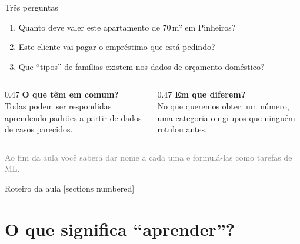 \documentclass[aspectratio=169,11pt]{beamer}
\begin{document}
\maketitle

\begin{frame}{Três perguntas}
  \begin{enumerate}
    \item Quanto deve valer este apartamento de 70\,m² em Pinheiros?
    \item Este cliente vai pagar o empréstimo que está pedindo?
    \item Que ``tipos'' de famílias existem nos dados de orçamento doméstico?
  \end{enumerate}
  \bigskip
  \begin{columns}[T]
    \begin{column}{0.47\textwidth}
      \textbf{O que têm em comum?}\\
      Todas podem ser respondidas \alert{aprendendo padrões a partir de dados}
      de casos parecidos.
    \end{column}
    \begin{column}{0.47\textwidth}
      \textbf{Em que diferem?}\\
      No que queremos obter: um \alert{número}, uma \alert{categoria} ou
      \alert{grupos} que ninguém rotulou antes.
    \end{column}
  \end{columns}
  \bigskip
  \centering\small\textcolor{gray}{Ao fim da aula você saberá dar nome a cada uma e formulá-las como tarefas de ML.}
\end{frame}

\begin{frame}{Roteiro da aula}
  [sections numbered]
  \small\tableofcontents[hideallsubsections]
\end{frame}

\section{O que significa ``aprender''?}
\end{document}
